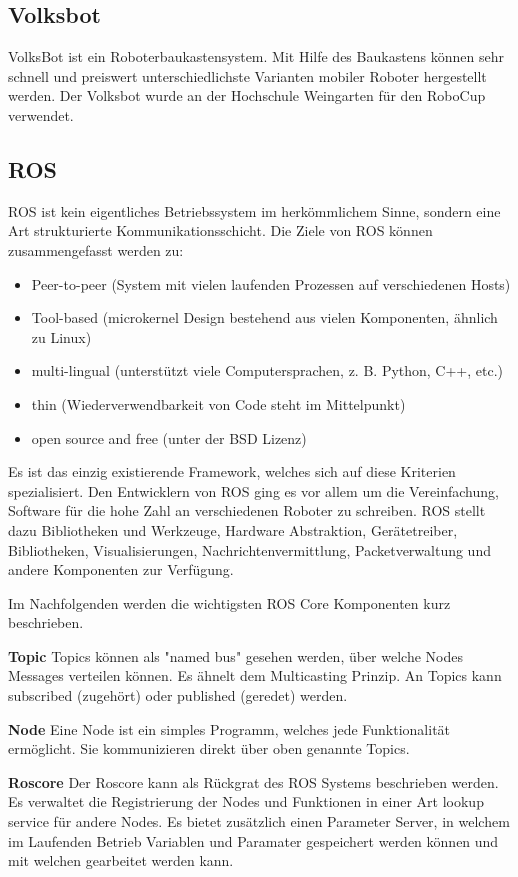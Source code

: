 \documentclass[12pt]{article}
\begin{document}
\subsection{Volksbot}

VolksBot ist ein Roboterbaukastensystem.
Mit Hilfe des Baukastens können sehr schnell und preiswert unterschiedlichste Varianten mobiler Roboter hergestellt werden.
Der Volksbot wurde an der Hochschule Weingarten für den RoboCup verwendet.
\subsection{ROS}
ROS ist kein eigentliches Betriebssystem im herkömmlichem Sinne, sondern eine Art strukturierte Kommunikationsschicht.
Die Ziele von ROS können zusammengefasst werden zu:
\begin{itemize}
\item Peer-to-peer (System mit vielen laufenden Prozessen auf verschiedenen Hosts)
\item Tool-based (microkernel Design bestehend aus vielen Komponenten, ähnlich zu Linux)
\item multi-lingual (unterstützt viele Computersprachen, z. B. Python, C++, etc.)
\item thin (Wiederverwendbarkeit von Code steht im Mittelpunkt)
\item open source and free (unter der BSD Lizenz)
\end{itemize}
Es ist das einzig existierende Framework, welches sich auf diese Kriterien spezialisiert.
Den Entwicklern von ROS ging es vor allem um die Vereinfachung, Software für die hohe Zahl an verschiedenen Roboter zu schreiben.
ROS stellt dazu Bibliotheken und Werkzeuge, Hardware Abstraktion, Gerätetreiber, Bibliotheken, Visualisierungen, Nachrichtenvermittlung, Packetverwaltung und andere Komponenten zur Verfügung.

Im Nachfolgenden werden die wichtigsten ROS Core Komponenten kurz beschrieben.

{\bf Topic} Topics können als "named bus" gesehen werden, über welche Nodes Messages verteilen können. Es ähnelt dem Multicasting Prinzip. An Topics kann subscribed (zugehört) oder published (geredet) werden.

{\bf Node} Eine Node ist ein simples Programm, welches jede Funktionalität ermöglicht.  Sie kommunizieren direkt über oben genannte Topics.

{\bf Roscore} Der Roscore kann als Rückgrat des ROS Systems beschrieben werden. Es verwaltet die Registrierung der Nodes und Funktionen in einer Art lookup service für andere Nodes. Es bietet zusätzlich einen Parameter Server, in welchem im Laufenden Betrieb Variablen und Paramater gespeichert werden können und mit welchen gearbeitet werden kann.
\end{document}
